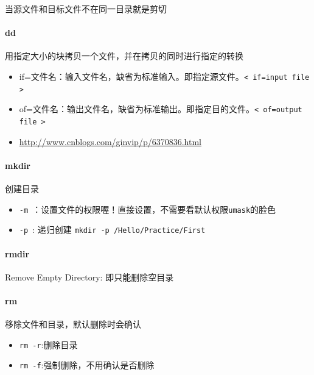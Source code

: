 \documentclass[UTF8,a4paper,12pt]{ctexbook}
\begin{document}
			当源文件和目标文件不在同一目录就是剪切
			
		\paragraph{dd} 用指定大小的块拷贝一个文件，并在拷贝的同时进行指定的转换
			\begin{itemize}[itemindent = 1em]
				\item if=文件名：输入文件名，缺省为标准输入。即指定源文件。\verb|< if=input file >|
				\item of=文件名：输出文件名，缺省为标准输出。即指定目的文件。\verb|< of=output file >|
				\item \url{http://www.cnblogs.com/ginvip/p/6370836.html}
			\end{itemize}
			
		\paragraph{mkdir} 创建目录
			\begin{itemize}[itemindent = 1em]
				\item \verb|-m |：设置文件的权限喔！直接设置，不需要看默认权限\verb|umask|的脸色
				\item \verb|-p |: 递归创建 \verb|mkdir -p /Hello/Practice/First|
			\end{itemize}
			
		\paragraph{rmdir} Remove Empty Directory: 即只能删除空目录

		\paragraph{rm} 移除文件和目录，默认删除时会确认
			\begin{itemize}[itemindent = 1em]
				\item \verb|rm -r|:删除目录
				\item \verb|rm -f|:强制删除，不用确认是否删除
			\end{itemize}
\end{document}
